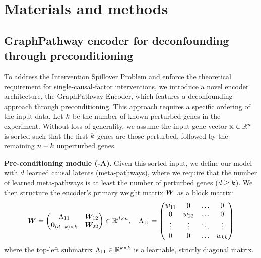 \section*{Materials and methods}

\subsection*{GraphPathway encoder for deconfounding through preconditioning}
To address the Intervention Spillover Problem and enforce the theoretical requirement for single-causal-factor interventions, we introduce a novel encoder architecture, the GraphPathway Encoder, which features a deconfounding approach through preconditioning.
This approach requires a specific ordering of the input data.
Let $k$ be the number of known perturbed genes in the experiment.
Without loss of generality, we assume the input gene vector ${\mathbf{x}} \in \mathbb{R}^n$ is sorted such that the first $k$ genes are those perturbed, followed by the remaining $n-k$ unperturbed genes.

\textbf{Pre-conditioning module (-A)}. Given this sorted input, we define our model with $d$ learned causal latents (meta-pathways), where we require that the number of learned meta-pathways is at least the number of perturbed genes ($d \ge k$).
We then structure the encoder's primary weight matrix ${\bm{W}}$ as a block matrix:
\begin{equation}
    {\bm{W}} =
    \begin{pmatrix}
        \Lambda_{11}   & {\bm{W}}_{12} \\
        {\bm{0}}_{(d-k) \times k} & {\bm{W}}_{22}
    \end{pmatrix}
    \in \mathbb{R}^{d \times n}
    , \quad
    \Lambda_{11} =
    \begin{pmatrix}
        w_{11} & 0      & \dots  & 0 \\
        0      & w_{22} & \dots  & 0 \\
        \vdots & \vdots & \ddots & \vdots \\
        0      & 0      & \dots  & w_{kk}
    \end{pmatrix}
    \label{eq:preconditioning_matrix}
\end{equation}
where the top-left submatrix $\Lambda_{11} \in \mathbb{R}^{k \times k}$ is a learnable, strictly diagonal matrix.

